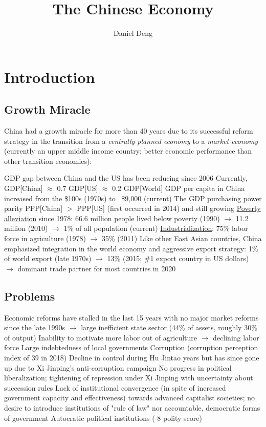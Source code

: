 \documentclass[11pt]{article}
\title{The Chinese Economy}
\author{Daniel Deng}
\date{}
\theoremstyle{definition}
\theoremstyle{remark}
\begin{document}
\maketitle

\section{Introduction}

\subsection{Growth Miracle}

China had a growth miracle for more than 40 years due to its successful reform strategy in the transition from a \textit{centrally planned economy} to a \textit{market economy} (currently an upper middle income country; better economic performance than other transition economies):
\begin{outline}[enumerate]
\1 GDP gap between China and the US has been reducing since 2006
	\2 Currently, GDP[China] $\approx$ 0.7 GDP[US] $\approx$ 0.2 GDP[World]
	\2 GDP per capita in China increased from the \$100s (1970s) to ~\$9,000 (current)
	\2 The GDP purchasing power parity PPP[China] $>$ PPP[US] (first occurred in 2014) and still growing
\1 \underline{Poverty alleviation} since 1978: 66.6 million people lived below poverty (1990) $\to$ 11.2 million (2010) $\to$ 1\% of all population (current)
\1 \underline{Industrialization}: 75\% labor force in agriculture (1978) $\to$ 35\% (2011)
\1 Like other East Asian countries, China emphasized integration in the world economy and aggressive export strategy: 1\% of world export (late 1970s) $\to$ 13\% (2015; \#1 export country in US dollars) $\to$ dominant trade partner for most countries in 2020
\end{outline}

\subsection{Problems}

\begin{outline}[enumerate]
\1 Economic reforms have stalled in the last 15 years with no major market reforms since the late 1990s $\to$ large inefficient state sector (44\% of assets, roughly 30\% of output)
\1 Inability to motivate more labor out of agriculture $\to$ declining labor force
\1 Large indebtedness of local governments
\1 Corruption (corruption perception index of 39 in 2018)
	\2 Decline in control during Hu Jintao years but has since gone up due to Xi Jinping's anti-corruption campaign
\1 No progress in political liberalization; tightening of repression under Xi Jinping with uncertainty about succession rules
	\2 Lack of institutional convergence (in spite of increased government capacity and effectiveness) towards advanced capitalist societies; no desire to introduce institutions of "rule of law" nor accountable, democratic forms of government 
	\2 Autocratic political institutions (-8 polity score)
\end{outline}
\clearpage
\end{document}
